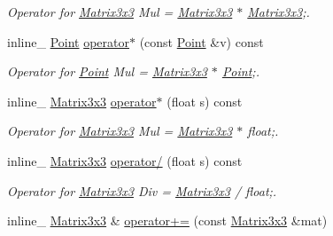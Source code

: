 \begin{DoxyCompactItemize}
\begin{DoxyCompactList}\small\item\em Operator for \hyperlink{classMatrix3x3}{Matrix3x3} Mul = \hyperlink{classMatrix3x3}{Matrix3x3} $\ast$ \hyperlink{classMatrix3x3}{Matrix3x3};. \end{DoxyCompactList}\item 
inline\+\_\+ \hyperlink{classPoint}{Point} \hyperlink{classMatrix3x3_ae0459b2a4ceb2fd36e2e2d4e2adc3cb6}{operator$\ast$} (const \hyperlink{classPoint}{Point} \&v) const \hypertarget{classMatrix3x3_ae0459b2a4ceb2fd36e2e2d4e2adc3cb6}{}\label{classMatrix3x3_ae0459b2a4ceb2fd36e2e2d4e2adc3cb6}

\begin{DoxyCompactList}\small\item\em Operator for \hyperlink{classPoint}{Point} Mul = \hyperlink{classMatrix3x3}{Matrix3x3} $\ast$ \hyperlink{classPoint}{Point};. \end{DoxyCompactList}\item 
inline\+\_\+ \hyperlink{classMatrix3x3}{Matrix3x3} \hyperlink{classMatrix3x3_aa3d255c9c691eff3528afcd70880a11c}{operator$\ast$} (float s) const \hypertarget{classMatrix3x3_aa3d255c9c691eff3528afcd70880a11c}{}\label{classMatrix3x3_aa3d255c9c691eff3528afcd70880a11c}

\begin{DoxyCompactList}\small\item\em Operator for \hyperlink{classMatrix3x3}{Matrix3x3} Mul = \hyperlink{classMatrix3x3}{Matrix3x3} $\ast$ float;. \end{DoxyCompactList}\item 
inline\+\_\+ \hyperlink{classMatrix3x3}{Matrix3x3} \hyperlink{classMatrix3x3_a8680510944c1491c1d44ae03746935ea}{operator/} (float s) const \hypertarget{classMatrix3x3_a8680510944c1491c1d44ae03746935ea}{}\label{classMatrix3x3_a8680510944c1491c1d44ae03746935ea}

\begin{DoxyCompactList}\small\item\em Operator for \hyperlink{classMatrix3x3}{Matrix3x3} Div = \hyperlink{classMatrix3x3}{Matrix3x3} / float;. \end{DoxyCompactList}\item 
inline\+\_\+ \hyperlink{classMatrix3x3}{Matrix3x3} \& \hyperlink{classMatrix3x3_afae9d530887621b836dd95428b38ed7c}{operator+=} (const \hyperlink{classMatrix3x3}{Matrix3x3} \&mat)\hypertarget{classMatrix3x3_afae9d530887621b836dd95428b38ed7c}{}\label{classMatrix3x3_afae9d530887621b836dd95428b38ed7c}


\end{DoxyCompactItemize}
